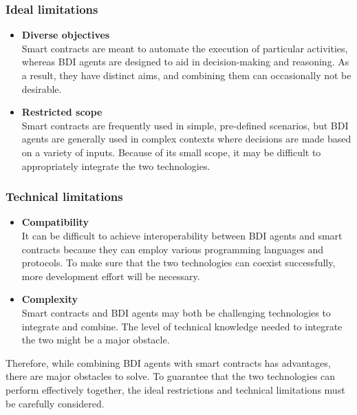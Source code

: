 \subsubsection{Ideal limitations}
\begin{itemize}
    \item\textbf{Diverse objectives}\\ Smart contracts are meant to automate the execution of particular activities, whereas \ac{BDI} agents are designed to aid in decision-making and reasoning. As a result, they have distinct aims, and combining them can occasionally not be desirable.

    \vspace{.5cm}
    
    \item\textbf{Restricted scope} \\ Smart contracts are frequently used in simple, pre-defined scenarios, but \ac{BDI} agents are generally used in complex contexts where decisions are made based on a variety of inputs. Because of its small scope, it may be difficult to appropriately integrate the two technologies.
    
\end{itemize}

\subsubsection{Technical limitations}
\begin{itemize}
    \item\textbf{Compatibility}\\ It can be difficult to achieve interoperability between \ac{BDI} agents and smart contracts because they can employ various programming languages and protocols. To make sure that the two technologies can coexist successfully, more development effort will be necessary.

    \vspace{.5cm}
    
    \item\textbf{Complexity} \\ Smart contracts and \ac{BDI} agents may both be challenging technologies to integrate and combine. The level of technical knowledge needed to integrate the two might be a major obstacle.
    
\end{itemize}

Therefore, while combining \ac{BDI} agents with smart contracts has advantages, there are major obstacles to solve. To guarantee that the two technologies can perform effectively together, the ideal restrictions and technical limitations must be carefully considered.

